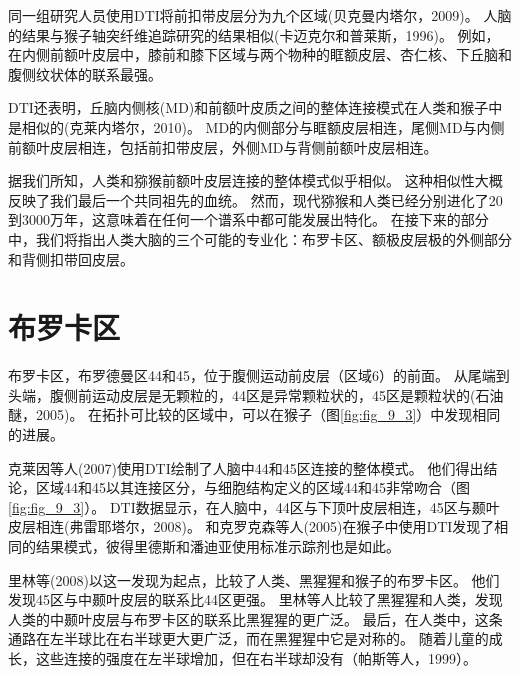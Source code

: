 同一组研究人员使用DTI将前扣带皮层分为九个区域(贝克曼内塔尔，2009)。
人脑的结果与猴子轴突纤维追踪研究的结果相似(卡迈克尔和普莱斯，1996)。
例如，在内侧前额叶皮层中，膝前和膝下区域与两个物种的眶额皮层、杏仁核、下丘脑和腹侧纹状体的联系最强。
\par


DTI还表明，丘脑内侧核(MD)和前额叶皮质之间的整体连接模式在人类和猴子中是相似的(克莱内塔尔，2010)。
MD的内侧部分与眶额皮层相连，尾侧MD与内侧前额叶皮层相连，包括前扣带皮层，外侧MD与背侧前额叶皮层相连。
\par


据我们所知，人类和猕猴前额叶皮层连接的整体模式似乎相似。
这种相似性大概反映了我们最后一个共同祖先的血统。
然而，现代猕猴和人类已经分别进化了20到3000万年，这意味着在任何一个谱系中都可能发展出特化。
在接下来的部分中，我们将指出人类大脑的三个可能的专业化：布罗卡区、额极皮层极的外侧部分和背侧扣带回皮层。



\section{布罗卡区}

布罗卡区，布罗德曼区44和45，位于腹侧运动前皮层（区域6）的前面。
从尾端到头端，腹侧前运动皮层是无颗粒的，44区是异常颗粒状的，45区是颗粒状的(石油醚，2005)。
在拓扑可比较的区域中，可以在猴子（图\ref{fig:fig_9_3}）中发现相同的进展。
\par


克莱因等人(2007)使用DTI绘制了人脑中44和45区连接的整体模式。
他们得出结论，区域44和45以其连接区分，与细胞结构定义的区域44和45非常吻合（图\ref{fig:fig_9_3}）。
DTI数据显示，在人脑中，44区与下顶叶皮层相连，45区与颞叶皮层相连(弗雷耶塔尔，2008)。
和克罗克森等人(2005)在猴子中使用DTI发现了相同的结果模式，彼得里德斯和潘迪亚使用标准示踪剂也是如此。
\par


里林等(2008)以这一发现为起点，比较了人类、黑猩猩和猴子的布罗卡区。
他们发现45区与中颞叶皮层的联系比44区更强。
里林等人比较了黑猩猩和人类，发现人类的中颞叶皮层与布罗卡区的联系比黑猩猩的更广泛。
最后，在人类中，这条通路在左半球比在右半球更大更广泛，而在黑猩猩中它是对称的。
随着儿童的成长，这些连接的强度在左半球增加，但在右半球却没有（帕斯等人，1999）。
\par



